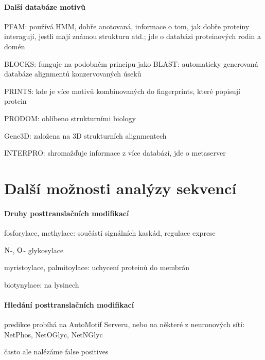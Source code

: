 \documentclass[DIV=8]{scrreprt}
\begin{document}
\paragraph{Další databáze motivů}
\begin{myItemize}[nosep]
    \item PFAM: používá HMM, dobře anotovaná, informace o tom, jak dobře proteiny interagují, jestli mají známou strukturu atd.; jde o databázi proteinových rodin a domén
    \item BLOCKS: funguje na podobném principu jako BLAST: automaticky generovaná databáze alignmentů konzervovaných úseků
    \item PRINTS: kde je více motivů kombinovaných do fingerprints, které popisují protein
    \item PRODOM: oblíbeno strukturními biology
    \item Gene3D: založena na 3D strukturních alignmentech
    \item INTERPRO: shromažďuje informace z více databází, jde o metaserver
\end{myItemize}



\section{Další možnosti analýzy sekvencí} \label{Další možnosti analýzy sekvencí} \FloatBarrier


\paragraph{Druhy posttranslačních modifikací}
\begin{myItemize}[nosep]
    \item fosforylace, methylace: součástí signálních kaskád, regulace exprese
    \item \(\ce{N}\)-, \(\ce{O}\)- glykosylace
    \item myristoylace, palmitoylace: uchycení proteinů do membrán
    \item biotynylace: na lysinech
\end{myItemize}



\paragraph{Hledání posttranslačních modifikací}
\begin{myItemize}[nosep]
    \item predikce probíhá na AutoMotif Serveru, nebo na některé z neuronových sítí: NetPhos, NetOGlyc, NetNGlyc
    \item často ale nalézáme false positives
\end{myItemize}
\end{document}
